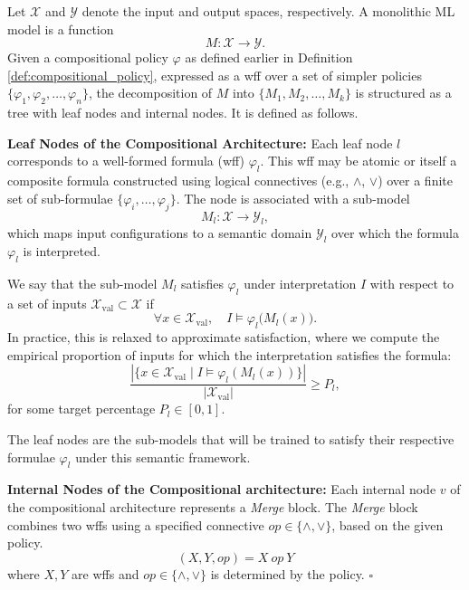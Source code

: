 \begin{definition}
 Let $\mathcal{X}$ and $\mathcal{Y}$ denote the input and output spaces, respectively. A monolithic ML model is a function 
    \[
 M \colon \mathcal{X} \to \mathcal{Y}.
    \]
\sloppy Given a compositional policy $\varphi$ as defined earlier in Definition \ref{def:compositional_policy}, expressed as a wff over a set of simpler policies $\{\varphi_1, \varphi_2, \dots, \varphi_n\}$, the decomposition of $M$ into $\{M_1, M_2, \dots, M_k\}$ is structured as a tree with leaf nodes and internal nodes. It is defined as follows.\vspace{0.5em} 
   
\noindent \textbf{Leaf Nodes of the Compositional Architecture:} 
Each leaf node $l$ corresponds to a well-formed formula (wff) $\varphi_l$. This wff may be atomic or itself a composite formula constructed using logical connectives (e.g., $\land$, $\lor$) over a finite set of sub-formulae $\{\varphi_i, \ldots, \varphi_j\}$. The node is associated with a sub-model
\[
M_l \colon \mathcal{X} \to \mathcal{Y}_l,
\]
which maps input configurations to a semantic domain $\mathcal{Y}_l$ over which the formula $\varphi_l$ is interpreted.

We say that the sub-model $M_l$ satisfies $\varphi_l$ under interpretation $I$ with respect to a set of inputs $\mathcal{X}_{\text{val}} \subset \mathcal{X}$ if
\[
\forall x \in \mathcal{X}_{\text{val}}, \quad I \models \varphi_l\big(M_l(x)\big).
\]
In practice, this is relaxed to approximate satisfaction, where we compute the empirical proportion of inputs for which the interpretation satisfies the formula:
\[
\frac{|\{x \in \mathcal{X}_{\text{val}} \mid I \models \varphi_l(M_l(x)) \}|}{|\mathcal{X}_{\text{val}}|} \geq P_l,
\]
for some target percentage $P_l \in [0, 1]$.

The leaf nodes are the sub-models that will be trained to satisfy their respective formulae $\varphi_l$ under this semantic framework.



\vspace{0.5em}
 \noindent \textbf{Internal Nodes of the Compositional  architecture:} Each internal node $v$ of the compositional  architecture represents a \textit{Merge} block. 
 The \textit{Merge} block combines two wffs using a specified connective $op \in \{\land, \lor\}$, based on the given policy.
    \[(X,Y,op)=X ~op~ Y\]
where $X,Y$ are wffs and $op \in \{\land, \lor\}$ is determined by the policy. $\square$

\end{definition}


